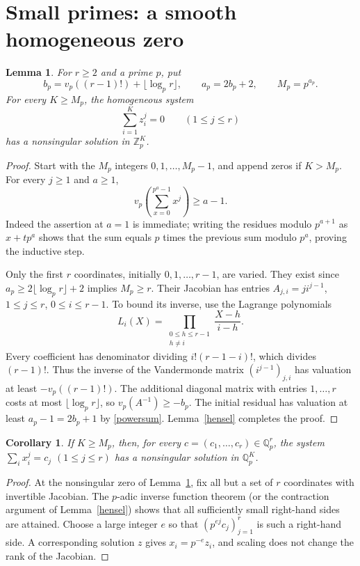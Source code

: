 \documentclass[11pt]{article}
\newtheorem{lemma}[theorem]{Lemma}
\newtheorem{corollary}[theorem]{Corollary}
\newcommand{\Q}{\mathbb Q}
\newcommand{\Z}{\mathbb Z}
\begin{document}
\section{Small primes: a smooth homogeneous zero}
\begin{lemma}\label{localzero}
For $r\ge2$ and a prime $p$, put
\[
 b_p=v_p((r-1)!)+\lfloor\log_p r\rfloor,
 \qquad a_p=2b_p+2,\qquad M_p=p^{a_p}.
\]
For every $K\ge M_p$, the homogeneous system
\begin{equation}\label{zero}
 \sum_{i=1}^K z_i^j=0\qquad(1\le j\le r)
\end{equation}
has a nonsingular solution in $\Z_p^K$.
\end{lemma}
\begin{proof}
Start with the $M_p$ integers $0,1,\ldots,M_p-1$, and append zeros if
$K>M_p$. For every $j\ge1$ and $a\ge1$,
\begin{equation}\label{powersum}
 v_p\left(\sum_{x=0}^{p^a-1}x^j\right)\ge a-1.
\end{equation}
Indeed the assertion at $a=1$ is immediate; writing the residues modulo
$p^{a+1}$ as $x+t p^a$ shows that the sum equals $p$ times the previous
sum modulo $p^a$, proving the inductive step.

Only the first $r$ coordinates, initially $0,1,\ldots,r-1$, are varied.
They exist since $a_p\ge2\lfloor\log_p r\rfloor+2$ implies $M_p\ge r$. Their Jacobian has entries
$A_{j,i}=j i^{j-1}$, $1\le j\le r$, $0\le i\le r-1$.
To bound its inverse, use the Lagrange polynomials
\[
 L_i(X)=\prod_{\substack{0\le h\le r-1\\h\ne i}}
              \frac{X-h}{i-h}.
\]
Every coefficient has denominator dividing $i!(r-1-i)!$, which divides
$(r-1)!$. Thus the inverse of the Vandermonde matrix
$(i^{j-1})_{j,i}$ has valuation at least $-v_p((r-1)!)$.
The additional diagonal matrix with entries $1,\ldots,r$ costs at most
$\lfloor\log_p r\rfloor$, so $v_p(A^{-1})\ge-b_p$.
The initial residual has valuation at least $a_p-1=2b_p+1$ by
\eqref{powersum}. Lemma~\ref{hensel} completes the proof.
\end{proof}

\begin{corollary}\label{universal}
If $K\ge M_p$, then, for every $c=(c_1,\ldots,c_r)\in\Q_p^r$, the
system $\sum_i x_i^j=c_j$ $(1\le j\le r)$ has a nonsingular solution
in $\Q_p^K$.
\end{corollary}
\begin{proof}
At the nonsingular zero of Lemma~\ref{localzero}, fix all but a set of
$r$ coordinates with invertible Jacobian. The $p$-adic inverse function
theorem (or the contraction argument of Lemma~\ref{hensel}) shows that
all sufficiently small right-hand sides are attained. Choose a large
integer $e$ so that $(p^{ej}c_j)_{j=1}^r$ is such a right-hand side.
A corresponding solution $z$ gives $x_i=p^{-e}z_i$, and scaling does not
change the rank of the Jacobian.
\end{proof}
\end{document}
